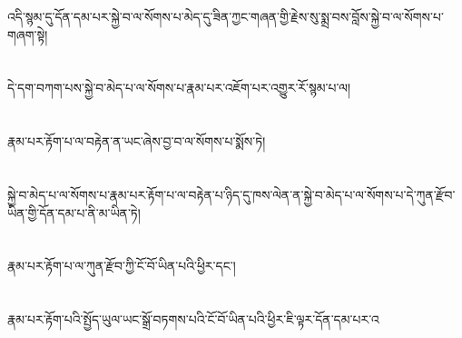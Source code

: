 འདི་སྙམ་དུ་དོན་དམ་པར་སྐྱེ་བ་ལ་སོགས་པ་མེད་དུ་ཟིན་ཀྱང་གཞན་གྱི་རྗེས་སུ་སྨྲ་བས་བློས་སྐྱེ་བ་ལ་སོགས་པ་གཞག་སྟེ།\chapter{ }དེ་དག་བཀག་པས་སྐྱེ་བ་མེད་པ་ལ་སོགས་པ་རྣམ་པར་འཇོག་པར་འགྱུར་རོ་སྙམ་པ་ལ།\chapter{ }རྣམ་པར་རྟོག་པ་ལ་བརྟེན་ན་ཡང་ཞེས་བྱ་བ་ལ་སོགས་པ་སྨོས་ཏེ།\chapter{ }སྐྱེ་བ་མེད་པ་ལ་སོགས་པ་རྣམ་པར་རྟོག་པ་ལ་བརྟེན་པ་ཉིད་དུ་ཁས་ལེན་ན་སྐྱེ་བ་མེད་པ་ལ་སོགས་པ་དེ་ཀུན་རྫོབ་ཡིན་གྱི་དོན་དམ་པ་ནི་མ་ཡིན་ཏེ།\chapter{ }རྣམ་པར་རྟོག་པ་ལ་ཀུན་རྫོབ་ཀྱི་ངོ་བོ་ཡིན་པའི་ཕྱིར་དང་།\chapter{ }རྣམ་པར་རྟོག་པའི་སྤྱོད་ཡུལ་ཡང་སྒྲོ་བཏགས་པའི་ངོ་བོ་ཡིན་པའི་ཕྱིར་ཇི་ལྟར་དོན་དམ་པར་འ